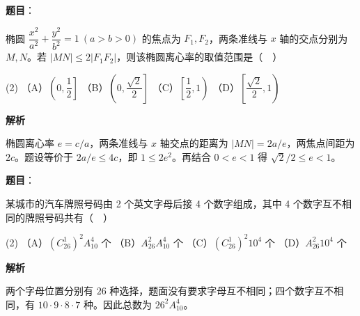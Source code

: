 \begin{answer}

\textbf{题目}：

椭圆 $\dfrac{x^2}{a^2}+\dfrac{y^2}{b^2}=1\ (a>b>0)$ 的焦点为 $F_1,F_2$，两条准线与 $x$ 轴的交点分别为 $M,N$。若 $|MN|\leq 2|F_1F_2|$，则该椭圆离心率的取值范围是（　）

\begin{gkopts}(2)
\task （A）$\left(0,\dfrac{1}{2}\right]$
\task （B）$\left(0,\dfrac{\sqrt{2}}{2}\right]$
\task （C）$\left[\dfrac{1}{2},1\right)$
\task （D）$\left[\dfrac{\sqrt{2}}{2},1\right)$
\end{gkopts}

\textbf{解析}

椭圆离心率 $e=c/a$，两条准线与 $x$ 轴交点的距离为 $|MN|=2a/e$，两焦点间距为 $2c$。题设等价于 $2a/e\leq4c$，即 $1\leq2e^2$。再结合 $0<e<1$ 得 $\sqrt2/2\leq e<1$。

\gkanswer{答案：D，$\left[\dfrac{\sqrt2}{2},1\right)$}

\end{answer}
\begin{answer}

\textbf{题目}：

某城市的汽车牌照号码由 2 个英文字母后接 4 个数字组成，其中 4 个数字互不相同的牌照号码共有（　）

\begin{gkopts}(2)
\task （A）$(C_{26}^{1})^2A_{10}^{4}$ 个
\task （B）$A_{26}^{2}A_{10}^{4}$ 个
\task （C）$(C_{26}^{1})^2 10^4$ 个
\task （D）$A_{26}^{2}10^4$ 个
\end{gkopts}

\textbf{解析}

两个字母位置分别有 $26$ 种选择，题面没有要求字母互不相同；四个数字互不相同，有 $10\cdot9\cdot8\cdot7$ 种。因此总数为 $26^2A_{10}^{4}$。


\end{answer}

